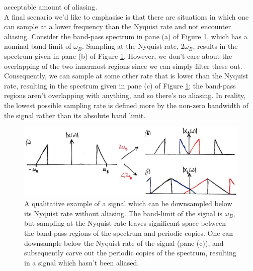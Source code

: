 acceptable amount of aliasing.\\
%
A final scenario we'd like to emphasise is that there are situations in which one can
sample at a lower frequency than the Nyquist rate and not encounter aliasing. Consider
the band-pass spectrum in pane (a) of Figure \ref{fig::lecture_14_undersample},
which has a nominal band-limit of
$\omega_B$. Sampling at the Nyquist rate, $2\omega_B$, results in the spectrum given
in pane (b) of Figure \ref{fig::lecture_14_undersample}. However, we don't care about the
overlapping of the
two innermost regions since we can simply filter these out. Consequently, we can sample
at some other rate that is lower than the Nyquist rate, resulting in the spectrum
given in pane (c) of Figure \ref{fig::lecture_14_undersample}; the band-pass regions aren't
overlapping with anything,
and so there's no aliasing. In reality, the lowest possible sampling rate is defined more
by the non-zero bandwidth of the signal rather than its absolute band limit.
%
\begin{figure}[H]
  \includegraphics[width=\textwidth]{images/lecture_14_undersample.JPG}
  \caption{A qualitative example of a signal which can be downsampled below
    its Nyquist rate without aliasing. The band-limit of the signal is $\omega_B$,
    but sampling at the Nyquist rate leaves significant space between the band-pass
    regions of the spectrum and periodic copies. One can downsample below the
    Nyquist rate of the signal (pane (c)), and subsequently carve out the
    periodic copies of the spectrum, resulting in a signal which hasn't been aliased.
  }
  \label{fig::lecture_14_undersample}
\end{figure}
%

